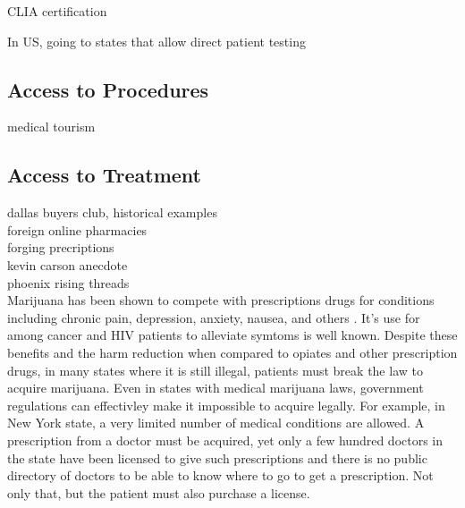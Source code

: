 \documentclass{article}
\begin{document}
CLIA certification



In US, going to states that allow direct patient testing

\subsection{Access to Procedures}

medical tourism\\



\subsection{Access to Treatment}

dallas buyers club, historical examples\\
foreign online pharmacies\\
forging precriptions\\
kevin carson anecdote\\
phoenix rising threads\\

Marijuana has been shown to compete with prescriptions drugs for conditions including chronic pain, depression, anxiety, nausea, and others \cite{bradford2016medical}. It's use for among cancer and HIV patients to alleviate symtoms is well known. Despite these benefits and the harm reduction when compared to opiates and other prescription drugs, in many states where it is still illegal, patients must break the law to acquire marijuana. Even in states with medical marijuana laws, government regulations can effectivley make it impossible to acquire legally. For example, in New York state, a very limited number of medical conditions are allowed. A prescription from a doctor must be acquired, yet only a few hundred doctors in the state have been licensed to give such prescriptions and there is no public directory of doctors to be able to know where to go to get a prescription. Not only that, but the patient must also purchase a license. 
\end{document}

